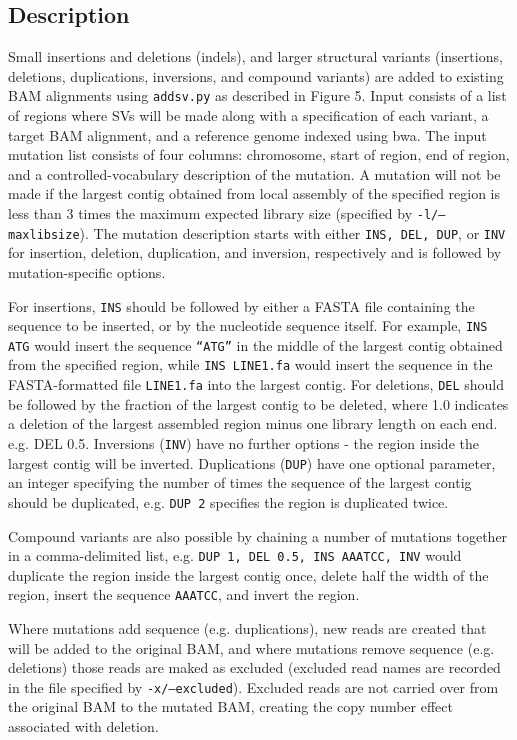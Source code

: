 \documentclass[letterpaper,11pt]{article}
\begin{document}
\subsection{Description}
    Small insertions and deletions (indels), and larger structural variants (insertions, deletions, duplications, inversions, and compound variants) are added to existing BAM alignments using \texttt{addsv.py} as described in Figure 5. Input consists of a list of regions where SVs will be made along with a specification of each variant, a target BAM alignment, and a reference genome indexed using bwa.
    The input mutation list consists of four columns: chromosome, start of region, end of region, and a controlled-vocabulary description of the mutation. A mutation will not be made if the largest contig obtained from local assembly of the specified region is less than 3 times the maximum expected library size (specified by \texttt{-l/--maxlibsize}). The mutation description starts with either \texttt{INS, DEL, DUP}, or \texttt{INV} for insertion, deletion, duplication, and inversion, respectively and is followed by mutation-specific options.

    For insertions, \texttt{INS} should be followed by either a FASTA file containing the sequence to be inserted, or by the nucleotide sequence itself. For example, \texttt{INS ATG} would insert the sequence \texttt{``ATG''} in the middle of the largest contig obtained from the specified region, while \texttt{INS LINE1.fa} would insert the sequence in the FASTA-formatted file \texttt{LINE1.fa} into the largest contig. For deletions, \texttt{DEL} should be followed by the fraction of the largest contig to be deleted, where 1.0 indicates a deletion of the largest assembled region minus one library length on each end. e.g. {DEL 0.5}. Inversions (\texttt{INV}) have no further options - the region inside the largest contig will be inverted. Duplications (\texttt{DUP}) have one optional parameter, an integer specifying the number of times the sequence of the largest contig should be duplicated, e.g. \texttt{DUP 2} specifies the region is duplicated twice.

    Compound variants are also possible by chaining a number of mutations together in a comma-delimited list, e.g. \texttt{DUP 1, DEL 0.5, INS AAATCC, INV} would duplicate the region inside the largest contig once, delete half the width of the region, insert the sequence \texttt{AAATCC}, and invert the region.
    
    Where mutations add sequence (e.g. duplications), new reads are created that will be added to the original BAM, and where mutations remove sequence (e.g. deletions) those reads are maked as excluded (excluded read names are recorded in the file specified by \texttt{-x/--excluded}). Excluded reads are not carried over from the original BAM to the mutated BAM, creating the copy number effect associated with deletion.
    
\end{document}
